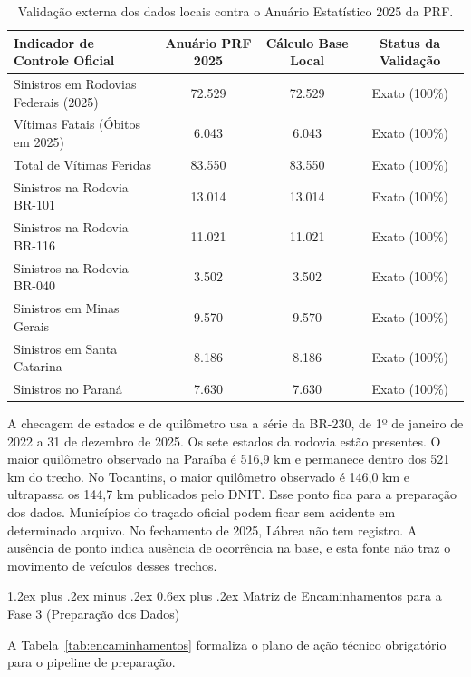 \documentclass[11pt,a4paper]{article}
\makeatletter
\renewcommand\subsection{
\@startsection{subsection}{2}{0pt}%
{1.2ex plus .2ex minus .2ex}%
{0.6ex plus .2ex}%
{\normalfont\large\bfseries\color{secondary}}
}
\makeatother
\begin{document}
\begin{table}[H]
\centering
\small
\renewcommand{\arraystretch}{1.2}
\caption{Validação externa dos dados locais contra o Anuário Estatístico 2025 da PRF.}
\label{tab:validacao}
\begin{tabularx}{\textwidth}{|X|c|c|c|}
\hline
\textbf{Indicador de Controle Oficial} & \textbf{Anuário PRF 2025} & \textbf{Cálculo Base Local} & \textbf{Status da Validação} \\
\hline
Sinistros em Rodovias Federais (2025) & 72.529 & 72.529 & Exato (100\%) \\
\hline
Vítimas Fatais (Óbitos em 2025) & 6.043 & 6.043 & Exato (100\%) \\
\hline
Total de Vítimas Feridas & 83.550 & 83.550 & Exato (100\%) \\
\hline
Sinistros na Rodovia BR-101 & 13.014 & 13.014 & Exato (100\%) \\
\hline
Sinistros na Rodovia BR-116 & 11.021 & 11.021 & Exato (100\%) \\
\hline
Sinistros na Rodovia BR-040 & 3.502 & 3.502 & Exato (100\%) \\
\hline
Sinistros em Minas Gerais & 9.570 & 9.570 & Exato (100\%) \\
\hline
Sinistros em Santa Catarina & 8.186 & 8.186 & Exato (100\%) \\
\hline
Sinistros no Paraná & 7.630 & 7.630 & Exato (100\%) \\
\hline
\end{tabularx}
\end{table}

A checagem de estados e de quilômetro usa a série da BR-230, de 1º de janeiro de 2022 a 31 de dezembro de 2025. Os sete estados da rodovia estão presentes. O maior quilômetro observado na Paraíba é 516,9 km e permanece dentro dos 521 km do trecho. No Tocantins, o maior quilômetro observado é 146,0 km e ultrapassa os 144,7 km publicados pelo DNIT. Esse ponto fica para a preparação dos dados. Municípios do traçado oficial podem ficar sem acidente em determinado arquivo. No fechamento de 2025, Lábrea não tem registro. A ausência de ponto indica ausência de ocorrência na base, e esta fonte não traz o movimento de veículos desses trechos.

\subsection{Matriz de Encaminhamentos para a Fase 3 (Preparação dos Dados)}

A Tabela~\ref{tab:encaminhamentos} formaliza o plano de ação técnico obrigatório para o pipeline de preparação.
\end{document}

